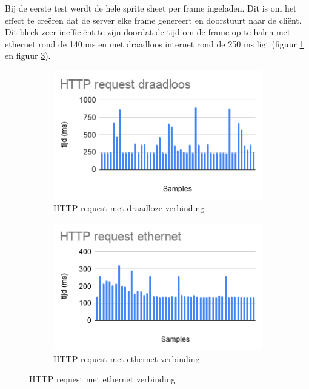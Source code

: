 Bij de eerste test werdt de hele sprite sheet per frame ingeladen. Dit is om het effect te creëren dat de server elke frame genereert en doorstuurt naar de cliënt. Dit bleek zeer inefficiënt te zijn doordat de tijd om de frame op te halen met ethernet rond de 140 ms en met draadloos internet rond de 250 ms ligt (figuur \ref{draadloos} en figuur \ref{ethernet}).

\begin{figure} [H]
	\centering
	\begin{subfigure} [b] {0.45\textwidth}
		\centering
		\includegraphics [width=\textwidth] {img/draadloos.png}
		\caption{HTTP request met draadloze verbinding} \label{draadloos}
	\end{subfigure}
	\begin{subfigure} [b] {0.45\textwidth}
		\centering
		\includegraphics [width=\textwidth] {img/ethernet.png}
		\caption{HTTP request met ethernet verbinding} \label{ethernet}
	\end{subfigure}
\end{figure}

